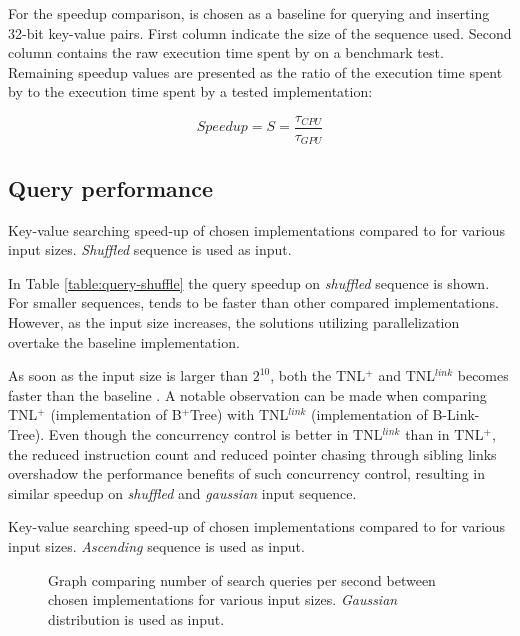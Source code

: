 For the speedup comparison,  is chosen as a baseline for querying and inserting 32-bit key-value pairs. First column indicate the size of the sequence used. Second column contains the raw execution time spent by  on a benchmark test. Remaining speedup values are presented as the ratio of the execution time spent by  to the execution time spent by a tested implementation:

$$\mathit{Speedup} = S = \frac{\tau_{\mathit{CPU}}}{\tau_{\mathit{GPU}}}$$

\subsection{Query performance}
\begin{table}[h]
  \centering
  
  \caption{Key-value searching speed-up of chosen implementations compared to  for various input sizes. \textit{Shuffled} sequence is used as input.}
  \label{table:query-shuffle}
\end{table}

In Table \ref{table:query-shuffle} the query speedup on \textit{shuffled} sequence is shown. For smaller sequences,  tends to be faster than other compared implementations. However, as the input size increases, the solutions utilizing parallelization overtake the baseline implementation.

As soon as the input size is larger than $2^{10}$, both the TNL$^+$ and TNL$^{link}$ becomes faster than the baseline . A notable observation can be made when comparing TNL$^+$ (implementation of B$^+$Tree) with TNL$^{link}$ (implementation of B-Link-Tree). Even though the concurrency control is better in TNL$^{link}$ than in TNL$^+$, the reduced instruction count and reduced pointer chasing through sibling links overshadow the performance benefits of such concurrency control, resulting in similar speedup on \textit{shuffled} and \textit{gaussian} input sequence.

\begin{table}[h]
  \centering
  
  \caption{Key-value searching speed-up of chosen implementations compared to  for various input sizes. \textit{Ascending} sequence is used as input.}
  \label{table:query-increasing}
\end{table}

\begin{figure}[H]
  
  \caption{Graph comparing number of search queries per second between chosen implementations for various input sizes. \textit{Gaussian} distribution is used as input.}
  \label{figure:query-gaussian}
\end{figure}

